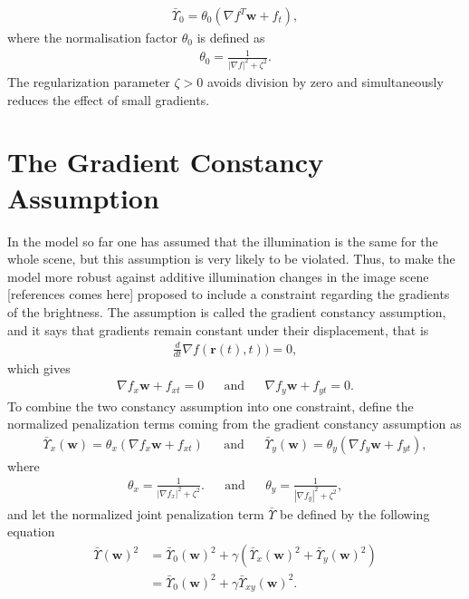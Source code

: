 \begin{align}
\label{norm_Upsilon}
\bar{\Upsilon}_0 = \theta_0 (\nabla f^T \textbf{w}+ f_t),
\end{align}
where the normalisation factor $\theta_0$ is defined as
\begin{align*}
\theta_0 = \frac{1}{|\nabla f|^2 + \zeta^2}.
\end{align*}
The regularization parameter $\zeta > 0$ avoids division by zero and simultaneously reduces the effect of small gradients.
\section{The Gradient Constancy Assumption}
In the model so far one has assumed that the illumination is the same for the whole scene, but this assumption is very likely to be violated. Thus, to make the model more robust against additive illumination changes in the image scene [references comes here] proposed to include a constraint regarding the gradients of the brightness. The assumption is called the gradient constancy assumption, and it says that gradients remain constant under their displacement, that is
\begin{align}
\frac{d}{dt}\nabla f(\textbf{r}(t),t)) = 0,
\end{align}
which gives
\begin{align}
\label{gca_constraint}
\nabla f_x \textbf{w} + f_{xt} = 0 & & \text{and} & &  \nabla f_y \textbf{w} + f_{yt} = 0.
\end{align}
To combine the two constancy assumption into one constraint,  define the normalized penalization terms coming from the gradient constancy assumption as
\begin{align}
\bar{\Upsilon}_x(\textbf{w}) = \theta_x (\nabla f_x \textbf{w} + f_{xt}) & & \text{and} & & \bar{\Upsilon}_y(\textbf{w})  = \theta_y (\nabla f_y \textbf{w} + f_{yt}),
\end{align}
where 
\begin{align*}
\theta_x = \frac{1}{|\nabla f_x|^2 + \zeta^2}. & & \text{and} & & \theta_y = \frac{1}{|\nabla f_y|^2 + \zeta^2},
\end{align*}
and let the normalized joint penalization term $\bar{\Upsilon}$ be defined by the following equation
\begin{align*}
\bar{\Upsilon}(\textbf{w})^2 &= \bar{\Upsilon}_0(\textbf{w})^2 + \gamma (\bar{\Upsilon}_x(\textbf{w})^2 + \bar{\Upsilon}_y(\textbf{w})^2) \\
&=  \bar{\Upsilon}_0(\textbf{w})^2 + \gamma \bar{\Upsilon}_{xy}(\textbf{w})^2.
\end{align*}
